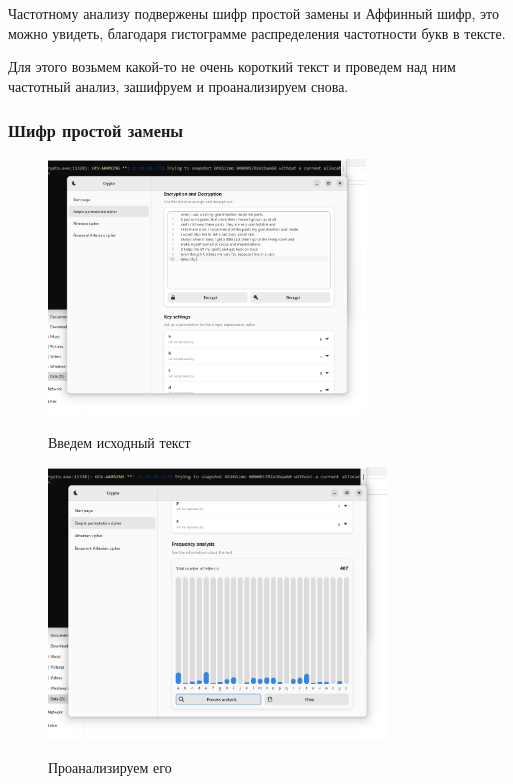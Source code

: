 \documentclass[a4paper]{article}
\begin{document}
  Частотному анализу подвержены шифр простой замены и Аффинный шифр, 
  это можно увидеть, благодаря гистограмме распределения частотности букв в тексте.

  Для этого возьмем какой-то не очень короткий текст и проведем над ним частотный анализ,
  зашифруем и проанализируем снова.

  \subsubsection{Шифр простой замены}

  \begin{figure}[H]  
    \centering
    \caption{Введем исходный текст}
    \includegraphics[width=0.75\textwidth]{01_0012}
    \label{img:0012}
  \end{figure}

  \begin{figure}[H]  
    \centering
    \caption{Проанализируем его}
    \includegraphics[width=0.8\textwidth]{01_0013}
    \label{img:0013}
  \end{figure}
  
\end{document}
